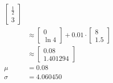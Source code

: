 \documentclass{exam}
\begin{document}
\begin{enumerate}
\begin{solutionorlines}[2in]
\begin{align*}
                \begin{bmatrix}
                \frac{1}{2}\\
                3
                \end{bmatrix} \tag{property of diagonal matrix}\\
                &\approx \begin{bmatrix}
                0\\
                \ln 4
                \end{bmatrix} + 0.01 \cdot 
                \begin{bmatrix}
                8\\
                1.5
                \end{bmatrix}\\
                &\approx \begin{bmatrix}
                0.08\\
                1.401294
                \end{bmatrix}\\
                \mu &= 0.08\\
                \sigma &= 4.060450
            \end{align*}
            

\end{solutionorlines}
\end{enumerate}
\end{document}
